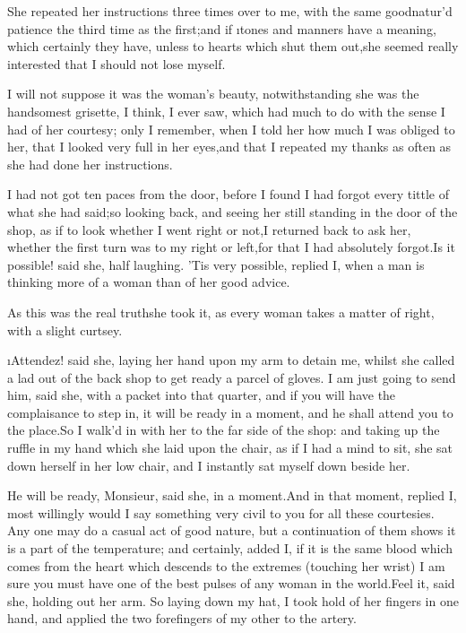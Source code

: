 \documentclass[twoside]{article}
\begin{document}
She repeated her instructions three times over to me, with the same
goodnatur’d patience the third time as the first;\tsk and if \i{tones and
manners} have a meaning, which certainly they have, unless to hearts
which shut them out,\tsk she seemed really interested that I should not lose
myself.

I will not suppose it was the woman’s beauty, notwithstanding she was the
handsomest grisette, I think, I ever saw, which had much to do with the
sense I had of her courtesy; only I remember, when I told her how much I
was obliged to her, that I looked very full in her eyes,\tsk and that I
repeated my thanks as often as she had done her instructions.

I had not got ten paces from the door, before I found I had forgot every
tittle of what she had said;\tsk so looking back, and seeing her still
standing in the door of the shop, as if to look whether I went right or
not,\tsk I returned back to ask her, whether the first turn was to my right
or left,\tsk for that I had absolutely forgot.\tsk Is it possible! said she, half
laughing.  ’Tis very possible, replied I, when a man is thinking more of
a woman than of her good advice.

As this was the real truth\tsk she took it, as every woman takes a matter of
right, with a slight curtsey.

\tsk \i{Attendez}! said she, laying her hand upon my arm to detain me, whilst
she called a lad out of the back shop to get ready a parcel of gloves.  I
am just going to send him, said she, with a packet into that quarter, and
if you will have the complaisance to step in, it will be ready in a
moment, and he shall attend you to the place.\tsk So I walk’d in with her to
the far side of the shop: and taking up the ruffle in my hand which she
laid upon the chair, as if I had a mind to sit, she sat down herself in
her low chair, and I instantly sat myself down beside her.

\tsk He will be ready, Monsieur, said she, in a moment.\tsk And in that moment,
replied I, most willingly would I say something very civil to you for all
these courtesies.  Any one may do a casual act of good nature, but a
continuation of them shows it is a part of the temperature; and
certainly, added I, if it is the same blood which comes from the heart
which descends to the extremes (touching her wrist) I am sure you must
have one of the best pulses of any woman in the world.\tsk Feel it, said she,
holding out her arm.  So laying down my hat, I took hold of her fingers
in one hand, and applied the two forefingers of my other to the artery.\tsk 
\end{document}
